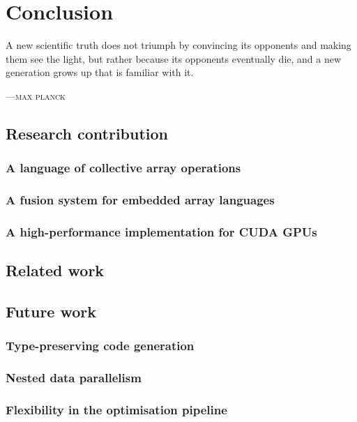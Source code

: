 %
%

\chapter{Conclusion}
\label{ch:conclusion}

\epigraph{A new scientific truth does not triumph by convincing its opponents
and making them see the light, but rather because its opponents eventually die,
and a new generation grows up that is familiar with it.}%
{\textsc{---max planck}}


\section{Research contribution}
\subsection{A language of collective array operations}
\subsection{A fusion system for embedded array languages}
\subsection{A high-performance implementation for CUDA GPUs}

\section{Related work}

\section{Future work}
\subsection{Type-preserving code generation}
\subsection{Nested data parallelism}
\subsection{Flexibility in the optimisation pipeline}



